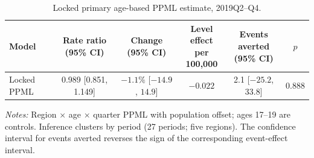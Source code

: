 \begin{table}[!htbp]
\centering
\caption{Locked primary age-based PPML estimate, 2019Q2--Q4.}
\label{tab:registry_primary}
\begingroup\footnotesize
\begin{tabular}{@{}lccccc@{}}
\toprule
Model & Rate ratio (95\% CI) & Change (95\% CI) &
\shortstack{Level effect\\per 100,000} &
\shortstack{Events averted\\(95\% CI)} & $p$ \\
\midrule
Locked PPML & 0.989 [0.851, 1.149] & $-1.1\%$ [$-14.9$, $14.9$] &
$-0.022$ & 2.1 [$-25.2$, 33.8] & 0.888 \\
\bottomrule
\end{tabular}
\par\smallskip
\begin{minipage}{0.96\linewidth}\footnotesize
\emph{Notes:} Region $\times$ age $\times$ quarter PPML with population offset;
ages 17--19 are controls. Inference clusters by period (27 periods; five regions).
The confidence interval for events averted reverses the sign of the corresponding
event-effect interval.
\end{minipage}
\endgroup
\end{table}
